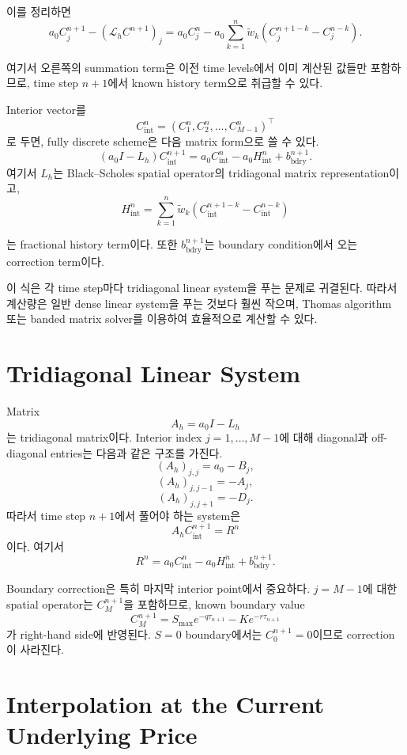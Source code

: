 \documentclass[11pt,a4paper]{report}
\begin{document}
이를 정리하면
\[
a_0 C_j^{n+1}
-
(\mathcal{L}_h C^{n+1})_j
=
a_0 C_j^n
-
a_0
\sum_{k=1}^{n}
\widetilde w_k
\left(
C_j^{n+1-k}-C_j^{n-k}
\right).
\]

여기서 오른쪽의 summation term은 이전 time levels에서 이미 계산된 값들만 포함하므로, time step $n+1$에서 known history term으로 취급할 수 있다.

Interior vector를
\[
C_{\mathrm{int}}^n
=
(C_1^n,C_2^n,\dots,C_{M-1}^n)^\top
\]
로 두면, fully discrete scheme은 다음 matrix form으로 쓸 수 있다.
\[
(a_0 I - L_h)C_{\mathrm{int}}^{n+1}
=
a_0 C_{\mathrm{int}}^n
-
a_0 H_{\mathrm{int}}^n
+
b_{\mathrm{bdry}}^{n+1}.
\]
여기서 $L_h$는 Black--Scholes spatial operator의 tridiagonal matrix representation이고,
\[
H_{\mathrm{int}}^n
=
\sum_{k=1}^{n}
\widetilde w_k
\left(
C_{\mathrm{int}}^{n+1-k}
-
C_{\mathrm{int}}^{n-k}
\right)
\]

는 fractional history term이다. 또한 $b_{\mathrm{bdry}}^{n+1}$는 boundary condition에서 오는 correction term이다.

이 식은 각 time step마다 tridiagonal linear system을 푸는 문제로 귀결된다. 따라서 계산량은 일반 dense linear system을 푸는 것보다 훨씬 작으며, Thomas algorithm 또는 banded matrix solver를 이용하여 효율적으로 계산할 수 있다.

\section{Tridiagonal Linear System}

Matrix
\[
A_h=a_0 I-L_h
\]
는 tridiagonal matrix이다. Interior index $j=1,\dots,M-1$에 대해 diagonal과 off-diagonal entries는 다음과 같은 구조를 가진다.
\[
(A_h)_{j,j}=a_0-B_j,
\]
\[
(A_h)_{j,j-1}=-A_j,
\]
\[
(A_h)_{j,j+1}=-D_j.
\]
따라서 time step $n+1$에서 풀어야 하는 system은
\[
A_h C_{\mathrm{int}}^{n+1}
=
R^n
\]
이다. 여기서
\[
R^n
=
a_0 C_{\mathrm{int}}^n
-
a_0 H_{\mathrm{int}}^n
+
b_{\mathrm{bdry}}^{n+1}.
\]

Boundary correction은 특히 마지막 interior point에서 중요하다. $j=M-1$에 대한 spatial operator는 $C_M^{n+1}$을 포함하므로, known boundary value
\[
C_M^{n+1}
=
S_{\max}e^{-q\tau_{n+1}}
-
Ke^{-r\tau_{n+1}}
\]
가 right-hand side에 반영된다. $S=0$ boundary에서는 $C_0^{n+1}=0$이므로 correction이 사라진다.

\section{Interpolation at the Current Underlying Price}
\end{document}
